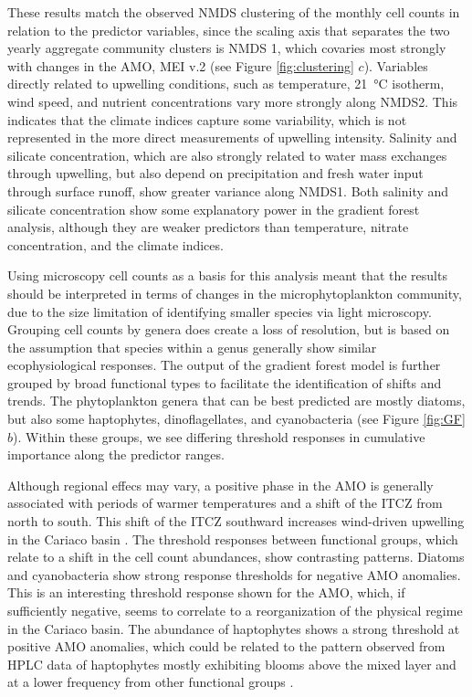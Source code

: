 These results match the observed NMDS clustering of the monthly cell counts in relation to the predictor variables, since the scaling axis that separates the two yearly aggregate community clusters is NMDS 1, which covaries most strongly with changes in the AMO, MEI v.2 (see Figure \ref{fig:clustering} $c$). Variables directly related to upwelling conditions, such as temperature, \qty{21}{\celsius} isotherm, wind speed, and nutrient concentrations vary more strongly along NMDS2. This indicates that the climate indices capture some variability, which is not represented in the more direct measurements of upwelling intensity. Salinity and silicate concentration, which are also strongly related to water mass exchanges through upwelling, but also depend on precipitation and fresh water input through surface runoff, show greater variance along NMDS1. Both salinity and silicate concentration show some explanatory power in the gradient forest analysis, although they are weaker predictors than temperature, nitrate concentration, and the climate indices. 

Using microscopy cell counts as a basis for this analysis meant that the results should be interpreted in terms of changes in the microphytoplankton community, due to the size limitation of identifying smaller species via light microscopy. Grouping cell counts by genera does create a loss of resolution, but is based on the assumption that species within a genus generally show similar ecophysiological responses. The output of the gradient forest model is further grouped by broad functional types to facilitate the identification of shifts and trends. The phytoplankton genera that can be best predicted are mostly diatoms, but also some haptophytes, dinoflagellates, and cyanobacteria (see Figure \ref{fig:GF} $b$). Within these groups, we see differing threshold responses in cumulative importance along the predictor ranges.

Although regional effecs may vary, a positive phase in the AMO is generally associated with periods of warmer temperatures and a shift of the ITCZ from north to south. This shift of the ITCZ southward increases wind-driven upwelling in the Cariaco basin \cite{taylor_ecosystem_2012}. The threshold responses between functional groups, which relate to a shift in the cell count abundances, show contrasting patterns. Diatoms and cyanobacteria show strong response thresholds for negative AMO anomalies. This is an interesting threshold response shown for the AMO, which, if sufficiently negative, seems to correlate to a reorganization of the physical regime in the Cariaco basin. The abundance of haptophytes shows a strong threshold at positive AMO anomalies, which could be related to the pattern observed from HPLC data of haptophytes mostly exhibiting blooms above the mixed layer and at a lower frequency from other functional groups \cite{pinckney_phytoplankton_2015}.

